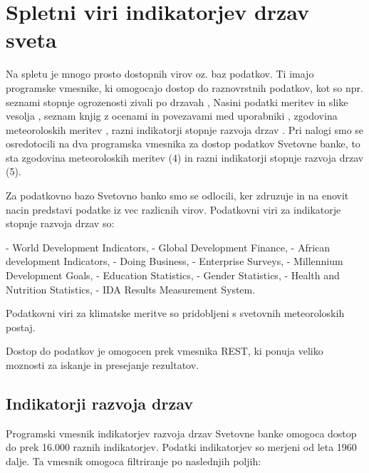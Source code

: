 \chapter{Spletni viri indikatorjev drzav sveta}

Na spletu je mnogo prosto dostopnih virov oz. baz podatkov. Ti imajo programske
vmesnike, ki omogocajo dostop do raznovrstnih podatkov, kot so npr. seznami 
stopnje ogrozenosti zivali po drzavah 
,
Nasini podatki meritev in slike vesolja
,
seznam knjig z ocenami in povezavami med uporabniki
,
zgodovina meteoroloskih meritev
,
razni indikatorji stopnje razvoja drzav
.
Pri nalogi smo se osredotocili na dva programska vmesnika za dostop podatkov 
Svetovne banke, to sta zgodovina meteoroloskih meritev (4) in razni 
indikatorji stopnje razvoja drzav (5).


% 
% 
% 
% 


Za podatkovno bazo Svetovno banko smo se odlocili, ker zdruzuje in na enovit
nacin predstavi podatke iz vec razlicnih virov. Podatkovni viri za indikatorje
stopnje razvoja drzav so:

- World Development Indicators, 
- Global Development Finance, 
- African development Indicators, 
- Doing Business,
- Enterprise Surveys, 
- Millennium Development Goals, 
- Education Statistics, 
- Gender Statistics,
- Health and Nutrition Statistics, 
- IDA Results Measurement System.

Podatkovni viri za klimatske meritve so pridobljeni s svetovnih meteoroloskih 
postaj.


Dostop do podatkov je omogocen prek vmesnika REST, ki ponuja veliko moznosti 
za iskanje in presejanje rezultatov.





\section{Indikatorji razvoja drzav}

Programski vmesnik indikatorjev razvoja drzav Svetovne banke omogoca dostop
do prek 16.000 raznih indikatorjev. Podatki indikatorjev so merjeni od leta
1960 dalje. Ta vmesnik omogoca filtriranje po naslednjih poljih:

